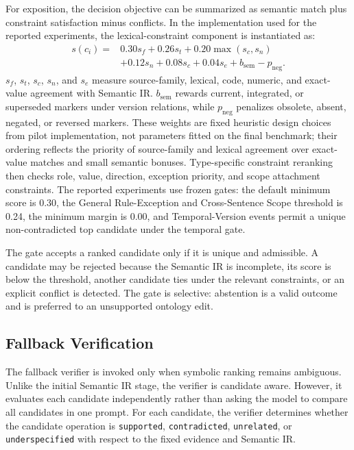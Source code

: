 \documentclass[conference]{IEEEtran}
\begin{document}
For exposition, the decision objective can be summarized as semantic match plus constraint satisfaction minus conflicts. In the implementation used for the reported experiments, the lexical-constraint component is instantiated as:
\[
\begin{aligned}
s(c_i)=&0.30s_f+0.26s_t+0.20\max(s_c,s_n)\\
&+0.12s_n+0.08s_c+0.04s_e+b_{\mathrm{sem}}-p_{\mathrm{neg}} .
\end{aligned}
\]
$s_f$, $s_t$, $s_c$, $s_n$, and $s_e$ measure source-family, lexical, code, numeric, and exact-value agreement with Semantic IR. $b_{\mathrm{sem}}$ rewards current, integrated, or superseded markers under version relations, while $p_{\mathrm{neg}}$ penalizes obsolete, absent, negated, or reversed markers. These weights are fixed heuristic design choices from pilot implementation, not parameters fitted on the final benchmark; their ordering reflects the priority of source-family and lexical agreement over exact-value matches and small semantic bonuses. Type-specific constraint reranking then checks role, value, direction, exception priority, and scope attachment constraints. The reported experiments use frozen gates: the default minimum score is 0.30, the General Rule-Exception and Cross-Sentence Scope threshold is 0.24, the minimum margin is 0.00, and Temporal-Version events permit a unique non-contradicted top candidate under the temporal gate.

The gate accepts a ranked candidate only if it is unique and admissible. A candidate may be rejected because the Semantic IR is incomplete, its score is below the threshold, another candidate ties under the relevant constraints, or an explicit conflict is detected. The gate is selective: abstention is a valid outcome and is preferred to an unsupported ontology edit.

\subsection{Fallback Verification}

The fallback verifier is invoked only when symbolic ranking remains ambiguous. Unlike the initial Semantic IR stage, the verifier is candidate aware. However, it evaluates each candidate independently rather than asking the model to compare all candidates in one prompt. For each candidate, the verifier determines whether the candidate operation is \texttt{supported}, \texttt{contradicted}, \texttt{unrelated}, or \texttt{underspecified} with respect to the fixed evidence and Semantic IR.
\end{document}
